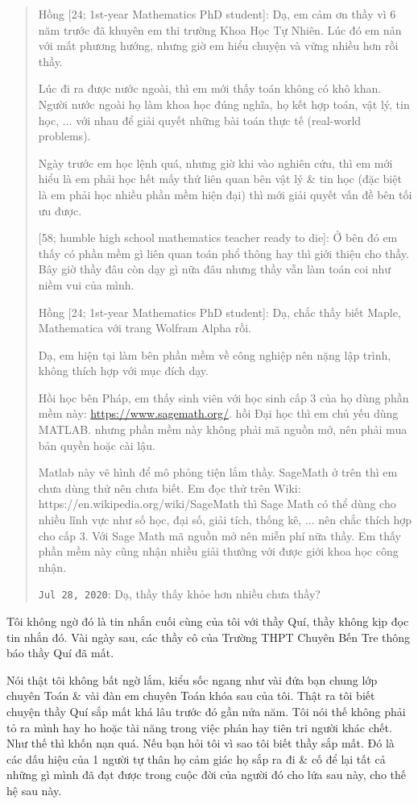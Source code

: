 \documentclass[12pt,oneside]{book}
\begin{document}
\begin{quote}
	{\sf Hồng [24; 1st-year Mathematics PhD student]}: Dạ, em cảm ơn thầy vì 6 năm trước đã khuyên em thi trường Khoa Học Tự Nhiên. Lúc đó em nản với mất phương hướng, nhưng giờ em hiểu chuyện và vững nhiều hơn rồi thầy.
	
	Lúc đi ra được nước ngoài, thì em mới thấy toán không có khô khan. Người nước ngoài họ làm khoa học đúng nghĩa, họ kết hợp toán, vật lý, tin học, $\ldots$ với nhau để giải quyết những bài toán thực tế (real-world problems).
	
	Ngày trước em học lệnh quá, nhưng giờ khi vào nghiên cứu, thì em mới hiểu là em phải học hết mấy thứ liên quan bên vật lý \& tin học (đặc biệt là em phải học nhiều phần mềm hiện đại) thì mới giải quyết vấn đề bên tối ưu được.
	
	{ [58; humble high school mathematics teacher ready to die]}: Ở bên đó em thấy có phần mềm gì liên quan toán phổ thông hay thì giới thiệu cho thầy. Bây giờ thầy đâu còn dạy gì nữa đâu nhưng thầy vẫn làm toán coi như niềm vui của mình.
	
	{\sf Hồng [24; 1st-year Mathematics PhD student]}: Dạ, chắc thầy biết Maple, Mathematica với trang Wolfram Alpha rồi.
	
	Dạ, em hiện tại làm bên phần mềm về công nghiệp nên nặng lập trình, không thích hợp với mục đích dạy.
	
	Hồi học bên Pháp, em thấy sinh viên với học sinh cấp 3 của họ dùng phần mềm này: \url{https://www.sagemath.org/}. hồi Đại học thì em chủ yếu dùng MATLAB. nhưng phần mềm này không phải mã nguồn mở, nên phải mua bản quyền hoặc cài lậu.
	
	Matlab này vẽ hình để mô phỏng tiện lắm thầy. SageMath ở trên thì em chưa dùng thử nên chưa biết. Em đọc thử trên Wiki: https://en.wikipedia.org/wiki/SageMath thì Sage Math có thể dùng cho nhiều lĩnh vực như số học, đại số, giải tích, thống kê, ... nên chắc thích hợp cho cấp 3. Với Sage Math mã nguồn mở nên miễn phí nữa thầy. Em thấy phần mềm này cũng nhận nhiều giải thưởng với được giới khoa học công nhận.
	
	{\tt Jul 28, 2020}: Dạ, thầy thấy khỏe hơn nhiều chưa thầy?
\end{quote}
Tôi không ngờ đó là tin nhắn cuối cùng của tôi với thầy {\sc Quí}, thầy không kịp đọc tin nhắn đó. Vài ngày sau, các thầy cô của Trường THPT Chuyên Bến Tre thông báo thầy {\sc Quí} đã mất.

Nói thật tôi không bất ngờ lắm, kiểu sốc ngang như vài đứa bạn chung lớp chuyên Toán \& vài đàn em chuyên Toán khóa sau của tôi. Thật ra tôi biết chuyện thầy {\sc Quí} sắp mất khá lâu trước đó gần nửa năm. Tôi nói thế không phải tỏ ra mình hay ho hoặc tài năng trong việc phán hay tiên tri người khác chết. Như thế thì khốn nạn quá. Nếu bạn hỏi tôi vì sao tôi biết thầy sắp mất. Đó là các dấu hiệu của 1 người tự thân họ cảm giác họ sắp ra đi \& cố để lại tất cả những gì mình đã đạt được trong cuộc đời của người đó cho lứa sau này, cho thế hệ sau này.
\end{document}
